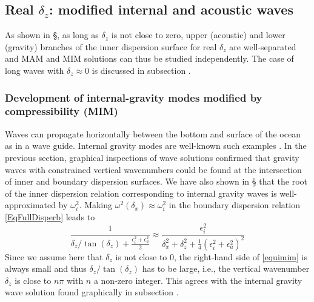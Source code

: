 \subsection{Real $\delta_z$: modified internal and acoustic waves}
As shown in \S{}, as long as $\delta_z$ is not close to zero, upper (acoustic) and lower (gravity) branches of the inner dispersion surface for real $\delta_z$ are well-separated and MAM and MIM solutions can thus be studied independently. The case of long waves with $\delta_z \approx 0$ is discussed in subsection .
%
\subsubsection{Development of internal-gravity modes modified by compressibility (MIM)}
\label{SubSectionGraphicMIW}
Waves can propagate horizontally between the bottom and surface of the ocean as in a wave guide. Internal gravity modes are  well-known such examples \citep{gill_1982}. In the previous section, graphical inspections of wave solutions confirmed that gravity waves with constrained vertical wavenumbers could be found at the intersection of inner and boundary dispersion surfaces.
We have also shown in \S{} that the root of the inner dispersion relation corresponding to internal gravity waves is well-approximated by $\omega_i^2$. Making $\omega^2(\delta_x) \approx\omega_i^2$ in the boundary dispersion relation \ref{EqFullDisperb} leads to 
%
\begin{equation}
		\frac{1}
{\delta_z/\tan(\delta_z)+\frac{\epsilon_i^2+\epsilon_a^2}{2}}
\approx
\frac{\epsilon_i^2}{\delta_x^2
	+\delta_z^2+\frac{1}{4}\left(
	\epsilon_i^2+\epsilon_a^2\right)^2}
\label{equimim}
\end{equation}
Since we assume here that $\delta_z$ is not close to 0, the right-hand side of \ref{equimim} is always small and thus $\delta_z/\tan(\delta_z)$ has to be large, i.e., the vertical wavenumber $\delta_z$ is close to $n\pi$ with $n$ a non-zero integer. This agrees with the internal gravity wave solution found graphically in subsection .

